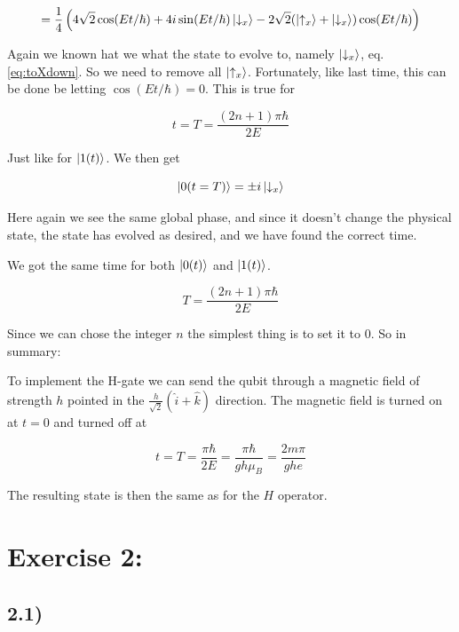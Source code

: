 \documentclass[a4paper,norsk, 10pt]{article}
\begin{document}
\begin{equation}
= \frac{1}{4}\left(4\sqrt{2}\cos(Et/\hbar) + 4i\sin(Et/\hbar)\ket{\downarrow_x} - 2\sqrt{2}(\ket{\uparrow_x} + \ket{\downarrow_x})\cos(Et/\hbar)\right)
\end{equation}

Again we known hat we what the state to evolve to, namely $\ket{\downarrow_x}$, eq. \eqref{eq:toXdown}. So we need to remove all $\ket{\uparrow_x}$. Fortunately, like last time, this can be done be letting $\cos(Et/\hbar) = 0$. This is true for 

\begin{equation}
t = T = \frac{(2n + 1)\pi\hbar}{2E}
\end{equation}

Just like for $\ket{1(t)}$. We then get

\begin{equation}
\ket{0(t=T)} = \pm i \ket{\downarrow_x}
\label{eq:downEvolved}
\end{equation}

Here again we see the same global phase, and since it doesn't change the physical state, the state has evolved as desired, and we have found the correct time.

We got the same time for both $\ket{0(t)}$ and $\ket{1(t)}$.

\begin{equation}
T = \frac{(2n + 1)\pi\hbar}{2E}
\end{equation}

Since we can chose the integer $n$ the simplest thing is to set it to $0$. So in summary:


To implement the H-gate we can send the qubit through a magnetic field of strength $h$ pointed in the $\frac{h}{\sqrt{2}}(\hat{i} + \hat{k})$ direction. The magnetic field is turned on at $t = 0$ and turned off at 

\begin{equation}
t  = T = \frac{\pi\hbar}{2E} = \frac{\pi \hbar}{g h \mu_B} = \frac{2m \pi}{g h e}
\end{equation}

The resulting state is then the same as for the $H$ operator.

\section{Exercise 2:}

\subsection{2.1)}\label{sec:21}
\end{document}
